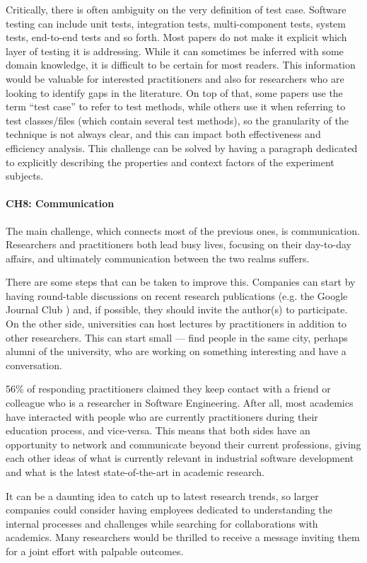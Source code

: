 Critically, there is often ambiguity on the very definition of test case.
Software testing can include unit tests, integration tests, multi-component tests, system tests, end-to-end tests and so forth.
Most papers do not make it explicit which layer of testing it is addressing. While it can sometimes be inferred with some domain knowledge, it is difficult to be certain for most readers.
This information would be valuable for interested practitioners and also for researchers who are looking to identify gaps in the literature.
On top of that, some papers use the term ``test case'' to refer to test methods, while others use it when referring to test classes/files (which contain several test methods), so the granularity of the technique is not always clear, and this can impact both effectiveness and efficiency analysis.
This challenge can be solved by having a paragraph dedicated to explicitly describing the properties and context factors of the experiment subjects.

\paragraph{CH8: Communication}
The main challenge, which connects most of the previous ones, is communication.
Researchers and practitioners both lead busy lives, focusing on their day-to-day affairs, and ultimately communication between the two realms suffers.

There are some steps that can be taken to improve this.
Companies can start by having round-table discussions on recent research publications (e.g. the Google Journal Club \cite{googlejournal}) and, if possible, they should invite the author(s) to participate.
On the other side, universities can host lectures by practitioners in addition to other researchers.
This can start small — find people in the same city, perhaps alumni of the university, who are working on something interesting and have a conversation.

56\% of responding practitioners claimed they keep contact with a friend or colleague who is a researcher in Software Engineering.
After all, most academics have interacted with people who are currently practitioners during their education process, and vice-versa.
This means that both sides have an opportunity to network and communicate beyond their current professions, giving each other ideas of what is currently relevant in industrial software development and what is the latest state-of-the-art in academic research.

It can be a daunting idea to catch up to latest research trends, so larger companies could consider having employees dedicated to understanding the internal processes and challenges while searching for collaborations with academics.
Many researchers would be thrilled to receive a message inviting them for a joint effort with palpable outcomes.
